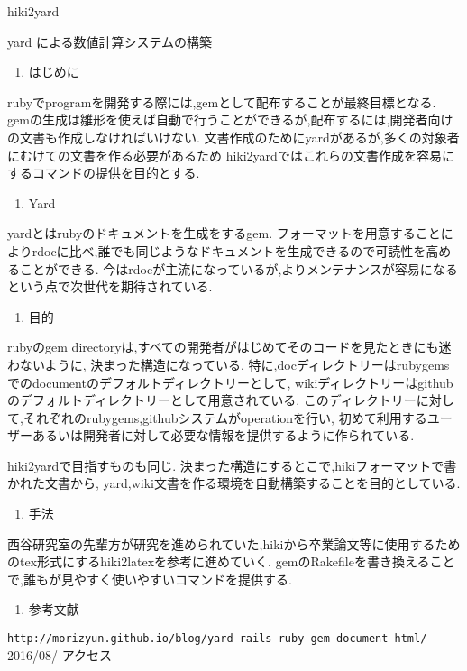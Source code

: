 \documentclass[12pt,a4paper]{jsarticle}
\begin{document}
hiki2yard

yard による数値計算システムの構築
\begin{enumerate}
\item はじめに
\end{enumerate}
rubyでprogramを開発する際には,gemとして配布することが最終目標となる.
gemの生成は雛形を使えば自動で行うことができるが,配布するには,開発者向けの文書も作成しなければいけない.
文書作成のためにyardがあるが,多くの対象者にむけての文書を作る必要があるため
hiki2yardではこれらの文書作成を容易にするコマンドの提供を目的とする.
\begin{enumerate}
\item Yard
\end{enumerate}
yardとはrubyのドキュメントを生成をするgem.
フォーマットを用意することによりrdocに比べ,誰でも同じようなドキュメントを生成できるので可読性を高めることができる.
今はrdocが主流になっているが,よりメンテナンスが容易になるという点で次世代を期待されている.
\begin{enumerate}
\item 目的
\end{enumerate}
rubyのgem directoryは,すべての開発者がはじめてそのコードを見たときにも迷わないように,
決まった構造になっている.
特に,docディレクトリーはrubygemsでのdocumentのデフォルトディレクトリーとして,
wikiディレクトリーはgithubのデフォルトディレクトリーとして用意されている.
このディレクトリーに対して,それぞれのrubygems,githubシステムがoperationを行い,
初めて利用するユーザーあるいは開発者に対して必要な情報を提供するように作られている.

hiki2yardで目指すものも同じ.
決まった構造にするとこで,hikiフォーマットで書かれた文書から,
yard,wiki文書を作る環境を自動構築することを目的としている.
\begin{enumerate}
\item 手法
\end{enumerate}
西谷研究室の先輩方が研究を進められていた,hikiから卒業論文等に使用するためのtex形式にするhiki2latexを参考に進めていく.
gemのRakefileを書き換えることで,誰もが見やすく使いやすいコマンドを提供する.
\begin{enumerate}
\item 参考文献
\end{enumerate}
\verb|http://morizyun.github.io/blog/yard-rails-ruby-gem-document-html/|
2016/08/  アクセス
\end{document}
